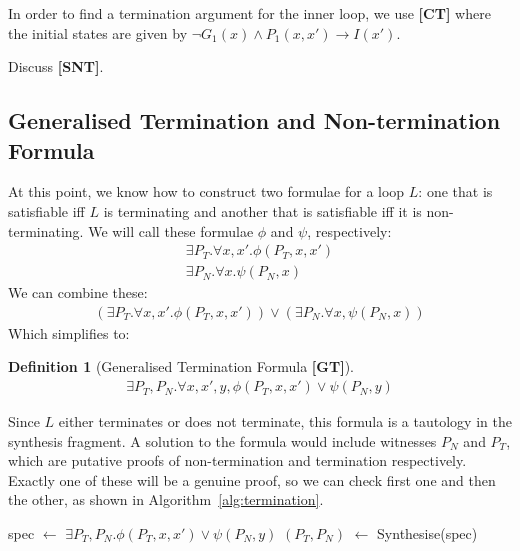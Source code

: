 \documentclass[preprint]{sigplanconf}
\theoremstyle{definition}
\newtheorem{definition}[theorem]{Definition}
\newcommand*\Let[2]{\State #1 $\gets$ #2}
\begin{document}
In order to find a termination argument for the inner loop, we use {\bf [CT]} where the initial states are given by 
$\neg G_1(x) \wedge P_1(x,x') \rightarrow I(x')$.


Discuss {\bf [SNT]}.\\

\fi

\subsection{Generalised Termination and Non-termination Formula}

At this point, we know how to construct two formulae for a loop $L$: one
that is satisfiable iff $L$ is terminating and another that is satisfiable
iff it is non-terminating.  We will call these formulae $\phi$ and $\psi$,
respectively:
%
\begin{align*}
 \exists P_T . \forall x, x' . \phi(P_T, x, x') \\
 \exists P_N . \forall x . \psi(P_N, x)
\end{align*}
%
We can combine these:
%
\begin{align*}
 (\exists P_T . \forall x, x'. \phi(P_T, x, x')) \vee (\exists P_N . \forall x, \psi(P_N, x))
\end{align*}
%
Which simplifies to:
\begin{definition}[Generalised Termination Formula {\bf [GT]}]
\label{def:general-termination}
\begin{align*}
 \exists P_T, P_N. \forall x, x', y, \phi(P_T, x, x') \vee \psi(P_N, y)
\end{align*}
\end{definition}

Since $L$ either terminates or does not terminate, this formula is a tautology in the synthesis fragment.
A solution to the formula would include witnesses $P_N$ and $P_T$, which are putative proofs of non-termination
and termination respectively.  Exactly one of these will be a genuine proof, so we can check
first one and then the other, as shown in Algorithm~\ref{alg:termination}.

\begin{algorithm}
 \caption{Bit-vector termination
 \label{alg:termination}}
 \begin{algorithmic}[1]
 \Statex
{}
  \Statex  {}
  \Let{spec}{$\exists P_T, P_N. \phi(P_T, x, x') \vee \psi(P_N, y)$}
  \Let{$(P_T, P_N)$}{{\sc Synthesise}(spec)}
    \State {}
    \State {}
  \EndIf
\EndFunction
 \end{algorithmic}
\end{algorithm}
\end{document}
